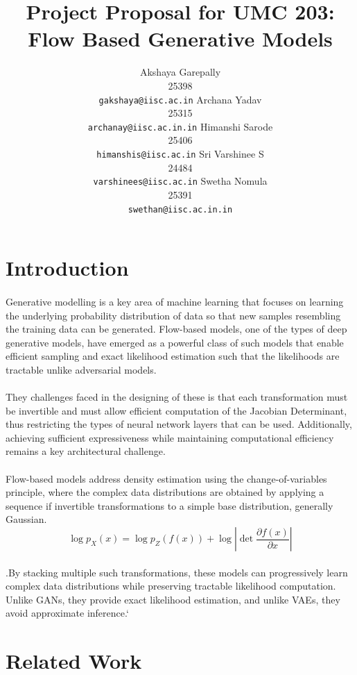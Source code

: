\documentclass{article}
\title{Project Proposal for UMC 203: \\
Flow Based Generative Models}
\author{%
  Akshaya Garepally \\
  25398 \\
  \texttt{gakshaya@iisc.ac.in}
    \And
  Archana Yadav \\
  25315 \\
  \texttt{archanay@iisc.ac.in.in}
    \And
  Himanshi Sarode \\
  25406\\
  \texttt{himanshis@iisc.ac.in}
  \And
  Sri Varshinee S \\
  24484 \\
  \texttt{varshinees@iisc.ac.in}
  \And
  Swetha Nomula \\
  25391 \\
  \texttt{swethan@iisc.ac.in.in}
}
\begin{document}
\maketitle


\section{Introduction}
\paragraph{}
Generative modelling is a key area of machine learning that focuses on learning the underlying probability distribution of data so that new samples resembling the training data can be generated. Flow-based models, one of the types of deep generative models, have emerged as a powerful class of such models that enable efficient sampling and exact likelihood estimation such that the likelihoods are tractable unlike adversarial models. 
\paragraph{}
They challenges faced in the designing of these is that each transformation must be invertible and must allow efficient computation of the Jacobian Determinant, thus restricting the types of neural network layers that can be used. Additionally, achieving sufficient expressiveness while maintaining computational efficiency remains a key architectural challenge.
\paragraph{}
Flow-based models address density estimation using the change-of-variables principle, where the complex data distributions are obtained by applying a sequence if invertible transformations to a simple base distribution, generally Gaussian. 
\[\log p_X(x) = \log p_Z(f(x)) + \log \left| \det \frac{\partial f(x)}{\partial x} \right|\]
\paragraph{}
.By stacking multiple such transformations, these models can progressively learn complex data distributions while preserving tractable likelihood computation. Unlike GANs, they provide exact likelihood estimation, and unlike VAEs, they avoid approximate inference.`
\section{Related Work}
\label{gen_inst}
\end{document}
